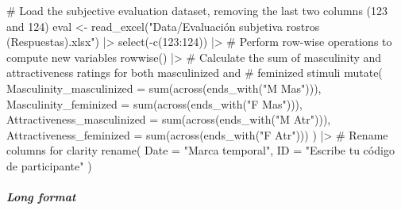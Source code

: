 \documentclass[
  bookmarksnumbered]{article}
\newenvironment{Shaded}{\begin{snugshade}}{\end{snugshade}}
\newcommand{\AttributeTok}[1]{\textcolor[rgb]{0.80,0.80,0.80}{#1}}
\newcommand{\CommentTok}[1]{\textcolor[rgb]{0.50,0.62,0.50}{#1}}
\newcommand{\DecValTok}[1]{\textcolor[rgb]{0.86,0.86,0.80}{#1}}
\newcommand{\FunctionTok}[1]{\textcolor[rgb]{0.94,0.94,0.56}{#1}}
\newcommand{\NormalTok}[1]{\textcolor[rgb]{0.80,0.80,0.80}{#1}}
\newcommand{\OtherTok}[1]{\textcolor[rgb]{0.94,0.94,0.56}{#1}}
\newcommand{\SpecialCharTok}[1]{\textcolor[rgb]{0.86,0.64,0.64}{#1}}
\newcommand{\StringTok}[1]{\textcolor[rgb]{0.80,0.58,0.58}{#1}}
\begin{document}
\begin{Shaded}
\begin{Highlighting}[]
\CommentTok{\# Load the subjective evaluation dataset, removing the last two columns (123 and 124)}
\NormalTok{eval }\OtherTok{\textless{}{-}} \FunctionTok{read\_excel}\NormalTok{(}\StringTok{"Data/Evaluación subjetiva rostros (Respuestas).xlsx"}\NormalTok{) }\SpecialCharTok{|\textgreater{}}
  \FunctionTok{select}\NormalTok{(}\SpecialCharTok{{-}}\FunctionTok{c}\NormalTok{(}\DecValTok{123}\SpecialCharTok{:}\DecValTok{124}\NormalTok{)) }\SpecialCharTok{|\textgreater{}}
  \CommentTok{\# Perform row{-}wise operations to compute new variables}
  \FunctionTok{rowwise}\NormalTok{() }\SpecialCharTok{|\textgreater{}}
  \CommentTok{\# Calculate the sum of masculinity and attractiveness ratings for both masculinized and}
  \CommentTok{\# feminized stimuli}
  \FunctionTok{mutate}\NormalTok{(}
    \AttributeTok{Masculinity\_masculinized =} \FunctionTok{sum}\NormalTok{(}\FunctionTok{across}\NormalTok{(}\FunctionTok{ends\_with}\NormalTok{(}\StringTok{"M Mas"}\NormalTok{))),}
    \AttributeTok{Masculinity\_feminized =} \FunctionTok{sum}\NormalTok{(}\FunctionTok{across}\NormalTok{(}\FunctionTok{ends\_with}\NormalTok{(}\StringTok{"F Mas"}\NormalTok{))),}
    \AttributeTok{Attractiveness\_masculinized =} \FunctionTok{sum}\NormalTok{(}\FunctionTok{across}\NormalTok{(}\FunctionTok{ends\_with}\NormalTok{(}\StringTok{"M Atr"}\NormalTok{))),}
    \AttributeTok{Attractiveness\_feminized =} \FunctionTok{sum}\NormalTok{(}\FunctionTok{across}\NormalTok{(}\FunctionTok{ends\_with}\NormalTok{(}\StringTok{"F Atr"}\NormalTok{)))}
\NormalTok{  ) }\SpecialCharTok{|\textgreater{}}
  \CommentTok{\# Rename columns for clarity}
  \FunctionTok{rename}\NormalTok{(}
    \AttributeTok{Date =} \StringTok{"Marca temporal"}\NormalTok{,}
    \AttributeTok{ID =} \StringTok{"Escribe tu código de participante"}
\NormalTok{  )}
\end{Highlighting}
\end{Shaded}

\subparagraph{Long format}\label{long-format}
\end{document}
